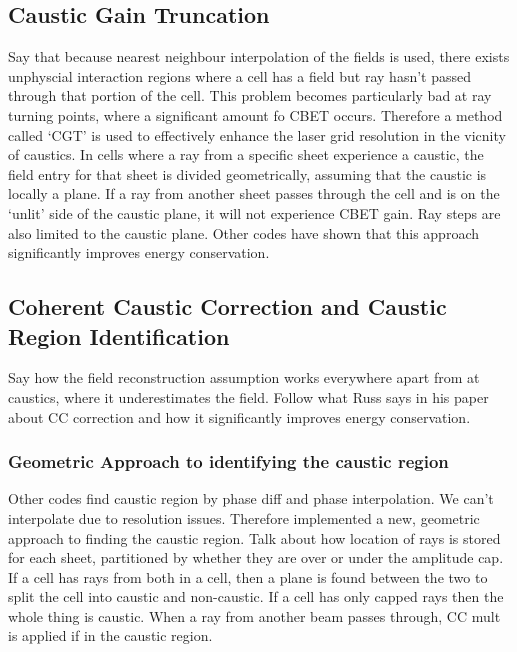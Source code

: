 \subsection{Caustic Gain Truncation}

Say that because nearest neighbour interpolation of the fields is used, there exists unphyscial interaction regions where a cell has a field but ray hasn't passed through that portion of the cell.
This problem becomes particularly bad at ray turning points, where a significant amount fo CBET occurs.
Therefore a method called `CGT' is used to effectively enhance the laser grid resolution in the vicnity of caustics.
In cells where a ray from a specific sheet experience a caustic, the field entry for that sheet is divided geometrically, assuming that the caustic is locally a plane.
If a ray from another sheet passes through the cell and is on the `unlit' side of the caustic plane, it will not experience CBET gain.
Ray steps are also limited to the caustic plane.
Other codes have shown that this approach significantly improves energy conservation.

\subsection{Coherent Caustic Correction and Caustic Region Identification}

Say how the field reconstruction assumption works everywhere apart from at caustics, where it underestimates the field.
Follow what Russ says in his paper about CC correction and how it significantly improves energy conservation.

\subsubsection{Geometric Approach to identifying the caustic region}

Other codes find caustic region by phase diff and phase interpolation.
We can't interpolate due to resolution issues.
Therefore implemented a new, geometric approach to finding the caustic region.
Talk about how location of rays is stored for each sheet, partitioned by whether they are over or under the amplitude cap.
If a cell has rays from both in a cell, then a plane is found between the two to split the cell into caustic and non-caustic.
If a cell has only capped rays then the whole thing is caustic.
When a ray from another beam passes through, CC mult is applied if in the caustic region.


